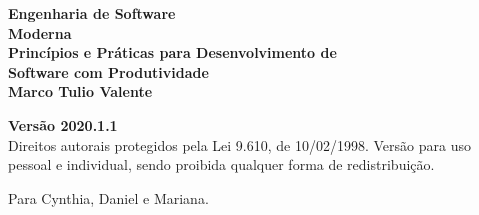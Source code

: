 \newpage
\thispagestyle{empty}
\vspace*{4cm}
\begin{center}
{\Huge \bf  Engenharia de Software\\[.3cm] Moderna}\\ 
\vspace*{1cm}
{\Large \bf  Princípios e Práticas para Desenvolvimento de\\[.3cm] Software com Produtividade}\\ 
\vspace*{3cm}
{\Large \bf Marco Tulio Valente}
\end{center}
\newpage

\newpage
\thispagestyle{empty}
\vspace*{5cm}
\begin{center}
{\Large \bf  Versão 2020.1.1}\\ 
\vspace*{1cm}
{\large Direitos autorais protegidos pela Lei 9.610, de 10/02/1998. Versão para  uso pessoal e individual, sendo proibida qualquer forma de redistribuição.}
\end{center}
\newpage

\newpage
\thispagestyle{empty}
\vspace*{5cm}
\begin{center}
\large Para Cynthia, Daniel e Mariana.
\end{center}
\newpage

\tableofcontents
